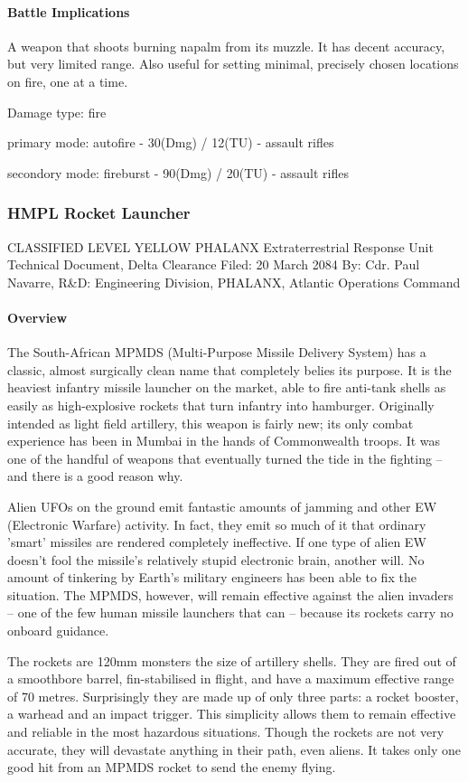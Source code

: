 \paragraph*{Battle Implications}
A weapon that shoots burning napalm from its muzzle. It has decent accuracy, but very limited range. Also useful for setting minimal, precisely chosen locations on fire, one at a time.
\begin{list}{Stats}{}
\item Damage type: fire
\item primary mode:  autofire - 30(Dmg) / 12(TU) - assault rifles
\item secondory mode: fireburst - 90(Dmg) / 20(TU) - assault rifles
\end{list}
\subsubsection*{HMPL Rocket Launcher}
CLASSIFIED LEVEL YELLOW
PHALANX Extraterrestrial Response Unit
Technical Document, Delta Clearance
Filed: 20 March 2084
By: Cdr. Paul Navarre, R&D: Engineering Division, PHALANX, Atlantic Operations Command
\paragraph*{Overview}
The South-African MPMDS (Multi-Purpose Missile Delivery System) has a classic, almost surgically clean name that completely belies its purpose. It is the heaviest infantry missile launcher on the market, able to fire anti-tank shells as easily as high-explosive rockets that turn infantry into hamburger. Originally intended as light field artillery, this weapon is fairly new; its only combat experience has been in Mumbai in the hands of Commonwealth troops. It was one of the handful of weapons that eventually turned the tide in the fighting -- and there is a good reason why.

Alien UFOs on the ground emit fantastic amounts of jamming and other EW (Electronic Warfare) activity. In fact, they emit so much of it that ordinary 'smart' missiles are rendered completely ineffective. If one type of alien EW doesn't fool the missile's relatively stupid electronic brain, another will. No amount of tinkering by Earth's military engineers has been able to fix the situation. The MPMDS, however, will remain effective against the alien invaders -- one of the few human missile launchers that can -- because its rockets carry no onboard guidance.

The rockets are 120mm monsters the size of artillery shells. They are fired out of a smoothbore barrel, fin-stabilised in flight, and have a maximum effective range of 70 metres. Surprisingly they are made up of only three parts: a rocket booster, a warhead and an impact trigger. This simplicity allows them to remain effective and reliable in the most hazardous situations. Though the rockets are not very accurate, they will devastate anything in their path, even aliens. It takes only one good hit from an MPMDS rocket to send the enemy flying.

